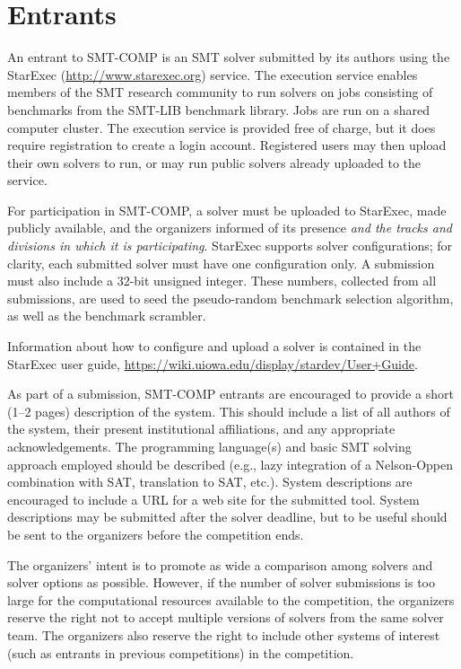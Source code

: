 \documentclass[12pt]{article}
\begin{document}

\section{Entrants}
\label{sec:entrants}

%
An entrant to SMT-COMP is an SMT solver submitted by its authors using
the StarExec (\url{http://www.starexec.org}) service.  The execution
service enables members of the SMT research community to run solvers
on jobs consisting of benchmarks from the SMT-LIB benchmark library.
Jobs are run on a shared computer cluster.  The execution service is
provided free of charge, but it does require registration to create a
login account.  Registered users may then upload their own solvers to
run, or may run public solvers already uploaded to the service.

For participation in SMT-COMP, a solver must be uploaded to StarExec,
made publicly available, and the organizers informed of its presence
{\em and the tracks and divisions in which it is
  participating}. StarExec supports solver configurations; for
clarity, each submitted solver must have one configuration only.  A
submission must also include a 32-bit unsigned integer.  These
numbers, collected from all submissions, are used to seed the
pseudo-random benchmark selection algorithm, as well as the benchmark
scrambler.

Information about how to configure and upload a solver is contained in
the StarExec user guide,
\url{https://wiki.uiowa.edu/display/stardev/User+Guide}.

%
As part of a submission, SMT-COMP entrants are encouraged to provide a
short (1--2 pages) description of the system.  This should include a
list of all authors of the system, their present institutional
affiliations, and any appropriate acknowledgements.  The programming
language(s) and basic SMT solving approach employed should be
described (e.g., lazy integration of a Nelson-Oppen combination with
SAT, translation to SAT, etc.).  System descriptions are encouraged to
include a URL for a web site for the submitted tool.  System
descriptions may be submitted after the solver deadline, but to be
useful should be sent to the organizers before the competition ends.

%
The organizers' intent is to promote as wide a comparison among
solvers and solver options as possible.  However, if the number of
solver submissions is too large for the computational resources
available to the competition, the organizers reserve the right not to
accept multiple versions of solvers from the same solver team.  The
organizers also reserve the right to include other systems of interest
(such as entrants in previous competitions) in the competition.
\end{document}
